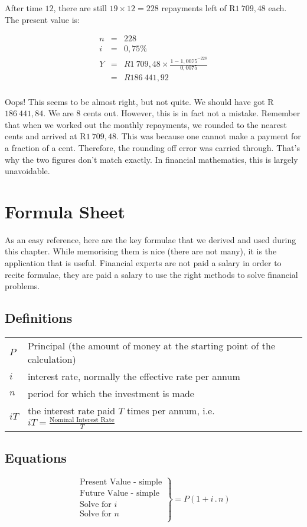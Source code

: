After time $12$, there are still $19 \times 12 = 228$ repayments left of R$1~709,48$ each. The present value is:

\begin{eqnarray*}
n &=& 228\\
i &=& 0,75\%\\
Y &=&R1~709,48 \times \frac{1-1,0075^{-228}}{0,0075}\\
&=& R186~441,92\\
\end{eqnarray*}

Oops! This seems to be almost right, but not quite. We should have got R$186~441,84$. We are $8$ cents out. However, this is in fact not a mistake. Remember that when we worked out the monthly repayments, we rounded to the nearest cents and arrived at R$1~709,48$. This was because one cannot make a payment for a fraction of a cent. Therefore, the rounding off error was carried through. That's why the two figures don't match exactly. In financial mathematics, this is largely unavoidable.


\section{Formula Sheet}
As an easy reference, here are the key formulae that we derived and used during this chapter. While memorising them is nice (there are not many), it is the application that is useful. Financial experts are not paid a salary in order to recite formulae, they are paid a salary to use the right methods to solve financial problems.

\subsection{Definitions}
\begin{tabular}{ll}
$P$ &Principal (the amount of money at the starting point of the calculation)\\
$i$ &interest rate, normally the effective rate per annum\\
$n$ &period for which the investment is made\\
$iT$ &the interest rate paid $T$ times per annum, i.e. $iT = \frac{\mbox{Nominal Interest Rate}}{T}$
\end{tabular}

\subsection{Equations}
\begin{equation*}
\left.\begin{array}{l}
\mbox{Present Value - simple}\\
\mbox{Future Value - simple} \\
\mbox{Solve for $i$}\\
\mbox{Solve for $n$}\\
\end{array}\right\}= P (1 + i \,.\, n)
\end{equation*}

